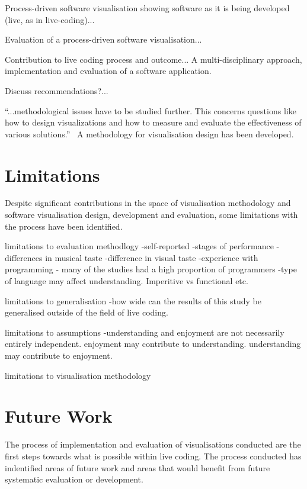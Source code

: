 Process-driven software visualisation showing software as it is being developed (live, as in live-coding)...

Evaluation of a process-driven software visualisation...

Contribution to live coding process and outcome... A multi-disciplinary approach, implementation and evaluation of a software application.

Discuss recommendations?...

``...methodological issues have to be studied further. This concerns questions like how to design visualizations and how to measure and evaluate the effectiveness of various solutions.''~\cite{VanWijk2005} A methodology for visualisation design has been developed.


\section{Limitations}

Despite significant contributions in the space of visualisation methodology and software visualisation design, development and evaluation, some limitations with the process have been identified.

limitations to evaluation methodlogy
-self-reported
-stages of performance
-differences in musical taste
-difference in visual taste
-experience with programming - many of the studies had a high proportion of programmers
-type of language may affect understanding. Imperitive vs functional etc.

limitations to generalisation
-how wide can the results of this study be generalised outside of the field of live coding.

limitations to assumptions
-understanding and enjoyment are not necessarily entirely independent. enjoyment may contribute to understanding. understanding may contribute to enjoyment.

limitations to visualisation methodology

\section{Future Work}

The process of implementation and evaluation of visualisations conducted are the first steps towards what is possible within live coding. The process conducted has indentified areas of future work and areas that would benefit from future systematic evaluation or development.

